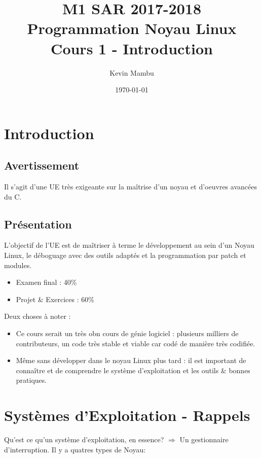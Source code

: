 \documentclass[10pt]{article}
\author{Kevin Mambu}
\date{\today}
\title{M1 SAR 2017-2018\\Programmation Noyau Linux\\Cours 1 - Introduction}
\begin{document}
\maketitle

\newpage
\tableofcontents

\newpage

\section{Introduction}

\subsection{Avertissement}
Il s'agit d'une UE très exigeante sur la maîtrise d'un noyau et d'oeuvres avancées
du C.

\subsection{Présentation}
L'objectif de l'UE est de maîtriser à terme le développement au sein d'un Noyau
Linux, le déboguage avec des outils adaptés et la programmation par patch et
modules.

\begin{itemize}
  \item Examen final : 40\%
  \item Projet \& Exercices : 60\%
\end{itemize}

Deux choses à noter :
\begin{itemize}
  \item Ce cours serait un très obn cours de génie logiciel : plusieurs milliers de
contributeurs, un code très stable et viable car codé de manière très codifiée.
  \item Même sans développer dans le noyau Linux plus tard : il est important de
connaître et de comprendre le système d'exploitation et les outils \& bonnes
pratiques.
\end{itemize}
\section{Systèmes d'Exploitation - Rappels}
Qu'est ce qu'un système d'exploitation, en essence? $\Rightarrow$ Un gestionnaire
d'interruption.
Il y a quatres types de Noyau:
\end{document}
